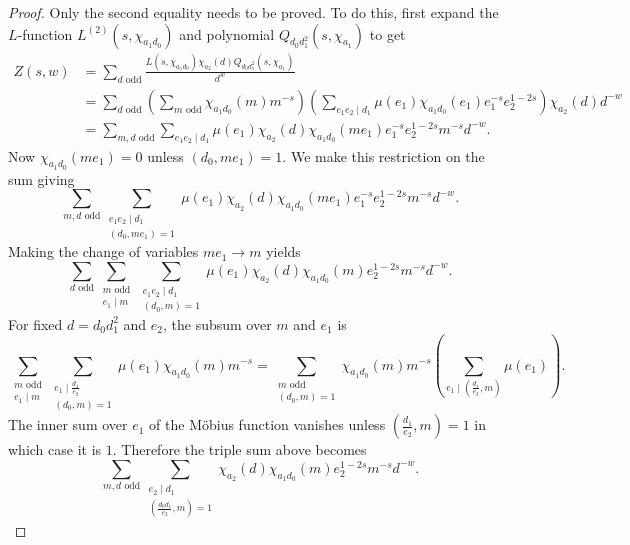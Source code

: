 \documentclass[12pt,reqno,oneside]{amsart}
\begin{document}
    \begin{proof}
        Only the second equality needs to be proved. To do this, first expand the $L$-function $L^{(2)}(s,\chi_{a_{1}d_{0}})$ and polynomial $Q_{d_{0}d_{1}^{2}}(s,\chi_{a_{1}})$ to get
        \begin{align*}
            Z(s,w) &= \sum_{\text{$d$ odd}}\frac{L(s,\chi_{a_{1}d_{0}})\chi_{a_{2}}(d)Q_{d_{0}d_{1}^{2}}(s,\chi_{a_{1}})}{d^{w}} \\
            &= \sum_{\text{$d$ odd}}\left(\sum_{\text{$m$ odd}}\chi_{a_{1}d_{0}}(m)m^{-s}\right)\left(\sum_{e_{1}e_{2} \mid d_{1}}\mu(e_{1})\chi_{a_{1}d_{0}}(e_{1})e_{1}^{-s}e_{2}^{1-2s}\right)\chi_{a_{2}}(d)d^{-w} \\
            &= \sum_{\text{$m,d$ odd}}\sum_{e_{1}e_{2} \mid d_{1}}\mu(e_{1})\chi_{a_{2}}(d)\chi_{a_{1}d_{0}}(me_{1})e_{1}^{-s}e_{2}^{1-2s}m^{-s}d^{-w}.
        \end{align*}
        Now $\chi_{a_{1}d_{0}}(me_{1}) = 0$ unless $(d_{0},me_{1}) = 1$. We make this restriction on the sum giving
        \[
            \sum_{\text{$m,d$ odd}}\sum_{\substack{e_{1}e_{2} \mid d_{1} \\ (d_{0},me_{1}) = 1}}\mu(e_{1})\chi_{a_{2}}(d)\chi_{a_{1}d_{0}}(me_{1})e_{1}^{-s}e_{2}^{1-2s}m^{-s}d^{-w}.
        \]
        Making the change of variables $me_{1} \to m$ yields
        \[
            \sum_{\text{$d$ odd}}\sum_{\substack{\text{$m$ odd} \\ e_{1} \mid m}}\sum_{\substack{e_{1}e_{2} \mid d_{1} \\ (d_{0},m) = 1}}\mu(e_{1})\chi_{a_{2}}(d)\chi_{a_{1}d_{0}}(m)e_{2}^{1-2s}m^{-s}d^{-w}.
        \]
        For fixed $d = d_{0}d_{1}^{2}$ and $e_{2}$, the subsum over $m$ and $e_{1}$ is
        \[
            \sum_{\substack{\text{$m$ odd} \\ e_{1} \mid m}}\sum_{\substack{e_{1} \mid \frac{d_{1}}{e_{2}} \\ (d_{0},m) = 1}}\mu(e_{1})\chi_{a_{1}d_{0}}(m)m^{-s} = \sum_{\substack{\text{$m$ odd} \\ (d_{0},m) = 1}}\chi_{a_{1}d_{0}}(m)m^{-s}\left(\sum_{e_{1} \mid \left(\frac{d_{1}}{e_{2}},m\right)}\mu(e_{1})\right).
        \]
        The inner sum over $e_{1}$ of the M\"obius function vanishes unless $\left(\frac{d_{1}}{e_{2}},m\right) = 1$ in which case it is $1$. Therefore the triple sum above becomes
        \[
            \sum_{\text{$m,d$ odd}}\sum_{\substack{e_{2} \mid d_{1} \\ \left(\frac{d_{0}d_{1}}{e_{2}},m\right) = 1}}\chi_{a_{2}}(d)\chi_{a_{1}d_{0}}(m)e_{2}^{1-2s}m^{-s}d^{-w}.
\]
\end{proof}
\end{document}

